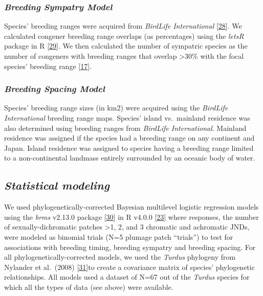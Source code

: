 \documentclass[
  a4paper,
]{article}
\begin{document}
\hypertarget{breeding-sympatry-model}{%
\subsubsection{\texorpdfstring{\emph{Breeding Sympatry
Model}}{Breeding Sympatry Model}}\label{breeding-sympatry-model}}

Species' breeding ranges were acquired from \emph{BirdLife
International}
{[}\protect\hyperlink{ref-birdlifeinternationalandhandbookofthebirdsoftheworld2018}{28}{]}⁠.
We calculated congener breeding range overlaps (as percentages) using
the \emph{letsR} package in R
{[}\protect\hyperlink{ref-vilela2015}{29}{]}⁠. We then calculated the
number of sympatric species as the number of congeners with breeding
ranges that overlap \textgreater30\% with the focal species' breeding
range {[}\protect\hyperlink{ref-cooney2017}{17}{]}.

\hypertarget{breeding-spacing-model}{%
\subsubsection{\texorpdfstring{\emph{Breeding Spacing
Model}}{Breeding Spacing Model}}\label{breeding-spacing-model}}

Species' breeding range sizes (in km2) were acquired using the
\emph{BirdLife International} breeding range maps. Species' island
vs.~mainland residence was also determined using breeding ranges from
\emph{BirdLife International}. Mainland residence was assigned if the
species had a breeding range on any continent and Japan. Island
residence was assigned to species having a breeding range limited to a
non-continental landmass entirely surrounded by an oceanic body of
water.

\hypertarget{statistical-modeling}{%
\subsection{\texorpdfstring{\emph{Statistical
modeling}}{Statistical modeling}}\label{statistical-modeling}}

We used phylogenetically-corrected Bayesian multilevel logistic
regression models using the \emph{brms} v2.13.0 package
{[}\protect\hyperlink{ref-burkner2017}{30}{]} in R v4.0.0
{[}\protect\hyperlink{ref-rcoreteam2020}{23}{]}⁠ where responses, the
number of sexually-dichromatic patches \textgreater1, 2, and 3 chromatic
and achromatic JNDs, were modeled as binomial trials (N=5 plumage patch
``trials'') to test for associations with breeding timing, breeding
sympatry and breeding spacing. For all phylogenetically-corrected
models, we used the \emph{Turdus} phylogeny from Nylander et al.~(2008)
{[}\protect\hyperlink{ref-nylander2008}{31}{]}to create a covariance
matrix of species' phylogenetic relationships. All models used a dataset
of N=67 out of the \emph{Turdus} species for which all the types of data
(see above) were available.
\end{document}
